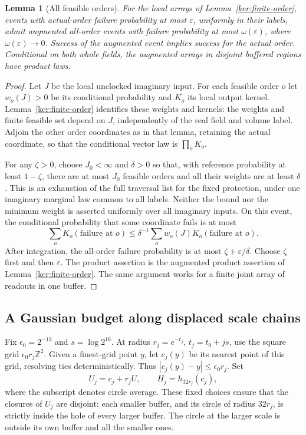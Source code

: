 \documentclass[11pt]{article}
\numberwithin{equation}{section}
\newtheorem{lemma}[theorem]{Lemma}
\theoremstyle{definition}
\theoremstyle{remark}
\newcommand{\Z}{\mathbb Z}
\newcommand{\1}{\mathbf 1}
\begin{document}
\begin{lemma}[All feasible orders]\label{ann:all-orders}
For the local arrays of Lemma~\ref{ker:finite-order}, events with
actual-order failure probability at most \(\varepsilon\), uniformly
in their labels, admit augmented all-order events with failure
probability at most \(\omega(\varepsilon)\), where
\(\omega(\varepsilon)\to0\).  Success of the augmented event implies
success for the actual order.  Conditional on both whole fields,
the augmented arrays in disjoint buffered regions have product laws.
\end{lemma}

\begin{proof}
Let \(J\) be the local unclocked imaginary input.  For each feasible
order \(o\) let \(w_o(J)>0\) be its conditional probability and
\(K_o\) its local output kernel.  Lemma~\ref{ker:finite-order}
identifies these weights and kernels: the weights and finite feasible
set depend on \(J\), independently of the real field and volume
label.  Adjoin the other order coordinates as in that lemma, retaining
the actual coordinate, so that the conditional vector law is
\(\prod_oK_o\).

For any \(\zeta>0\), choose \(J_0<\infty\) and \(\delta>0\)
so that, with reference probability at least \(1-\zeta\), there
are at most \(J_0\) feasible orders and all their weights are at
least \(\delta\). This is an exhaustion of the full traversal list for
the fixed protection, under one imaginary marginal law common to all labels.
Neither the bound nor the minimum weight is asserted uniformly over
all imaginary inputs.
On this event, the conditional probability that some coordinate
fails is at most
\[
 \sum_oK_o(\text{failure at }o)
 \le\delta^{-1}\sum_ow_o(J)K_o(\text{failure at }o).
\]
After integration, the all-order failure probability is at most
\(\zeta+\varepsilon/\delta\).  Choose \(\zeta\) first and then
\(\varepsilon\).  The product assertion is the augmented product
assertion of Lemma~\ref{ker:finite-order}.  The same argument works
for a finite joint array of readouts in one buffer.
\end{proof}

\subsection{A Gaussian budget along displaced scale chains}

Fix \(\epsilon_0=2^{-13}\) and \(s=\log 2^{16}\).
At radius \(r_j=e^{-t_j}\), \(t_j=t_0+js\), use the square grid
\(\epsilon_0r_j\Z^2\).
Given a finest-grid point \(y\), let \(c_j(y)\) be its nearest
point of this grid, resolving ties deterministically.
Thus \(|c_j(y)-y|\le\epsilon_0r_j\).
Set
\begin{equation}
 U_j=c_j+r_jU,\qquad
 H_j=h_{32r_j}(c_j),
 \label{ann:coarse-values}
\end{equation}
where the subscript denotes circle average.  These fixed choices
ensure that the closures of \(U_j\) are disjoint: each smaller buffer,
and its circle of radius \(32r_j\), is strictly inside the hole of
every larger buffer.  The circle at the larger scale is outside its
own buffer and all the smaller ones.
\end{document}
